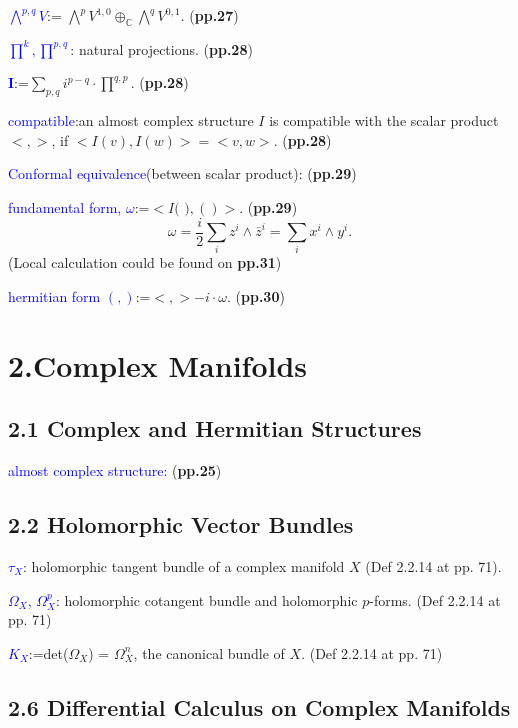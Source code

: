\documentclass{book}
\numberwithin{equation}{subsection} %
\theoremstyle{definition}
\begin{document}
    \textcolor{blue}{$\bigwedge^{p,q} V$}:=
    $\bigwedge^p V^{1,0}\oplus_{\mathbb{C}}\bigwedge^q V^{0,1}$.
    (\textbf{pp.27})

    \textcolor{blue}{$\prod^k,\prod^{p,q}$}: natural projections.
    (\textbf{pp.28})
    
    \textcolor{blue}{$\mathbf{I}$}:=$\sum_{p,q}i^{p-q}\cdot\prod^{q,p}$.
    (\textbf{pp.28})

    \textcolor{blue}{compatible}:an almost complex structure $I$ is
    compatible with the scalar product $<,>$, if $<I(v),I(w)>=<v,w>$.
    (\textbf{pp.28})

    \textcolor{blue}{Conformal equivalence}(between scalar product):
    (\textbf{pp.29})

    \textcolor{blue}{fundamental form, $\omega$}:=$<I\text{( )},()>.$
    (\textbf{pp.29})
    $$\omega=\frac{i}{2}\sum_i z^i\wedge\bar{z}^i=\sum_i x^i\wedge y^i.$$
    \quad(Local calculation could be found on \textbf{pp.31})

    \textcolor{blue}{hermitian form $(,)$}:=$<,>-i\cdot\omega$.
    (\textbf{pp.30})
\section{2.Complex Manifolds}

    \subsection{2.1 Complex and Hermitian Structures}
    \textcolor{blue}{almost complex structure}: (\textbf{pp.25})
	\subsection{2.2 Holomorphic Vector Bundles}

    \textcolor{blue}{$\tau_X$}: holomorphic tangent bundle of a complex manifold $X$ (Def 2.2.14 at pp. 71).
    
    \textcolor{blue}{$\varOmega_X$, $\varOmega^p_X$}: holomorphic cotangent bundle and holomorphic $p$-forms. (Def 2.2.14 at pp. 71)
    
    \textcolor{blue}{$K_X$}:=det($\varOmega_X$) = $\varOmega_X^n$, the canonical bundle of $X$. (Def 2.2.14 at pp. 71)

    \subsection{2.6 Differential Calculus on Complex Manifolds}
\end{document}
